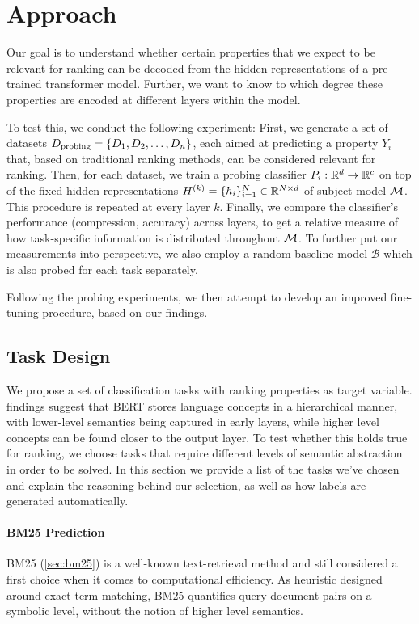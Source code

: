 \chapter{Approach}
\label{chap:approach}

Our goal is to understand whether certain properties that we expect to be relevant for ranking can be decoded from the hidden representations of a pre-trained transformer model. Further, we want to know to which degree these properties are encoded at different layers within the model.

To test this, we conduct the following experiment: First, we generate a set of datasets $D_{\text{probing}}=\{D_1, D_2, \dots, D_n \}$, each aimed at predicting a property $Y_i$ that, based on traditional ranking methods, can be considered relevant for ranking. Then, for each dataset, we train a probing classifier $P_i: \mathbb{R}^d \rightarrow \mathbb{R}^c$ on top of the fixed hidden representations $H^{(k)} = \{h_i\}_{i=1}^N \in \mathbb{R}^{N \times d}$ of subject model $\mathcal{M}$. This procedure is repeated at every layer $k$. Finally, we compare the classifier's performance (compression, accuracy) across layers, to get a relative measure of how task-specific information is distributed throughout $\mathcal{M}$. To further put our measurements into perspective, we also employ a random baseline model $\mathcal{B}$ which is also probed for each task separately.

Following the probing experiments, we then attempt to develop an improved fine-tuning procedure, based on our findings.

\section{Task Design}
\label{sec:tasks}
We propose a set of classification tasks with ranking properties as target variable. \cite{tenney-etal-2019-bert} findings suggest that BERT stores language concepts in a hierarchical manner, with lower-level semantics being captured in early layers, while higher level concepts can be found closer to the output layer. To test whether this holds true for ranking, we choose tasks that require different levels of semantic abstraction in order to be solved. In this section we provide a list of the tasks we've chosen and explain the reasoning behind our selection, as well as how labels are generated automatically.

\subsubsection{BM25 Prediction}
BM25 (\autoref{sec:bm25}) is a well-known text-retrieval method and still considered a first choice when it comes to computational efficiency. As heuristic designed around exact term matching, BM25 quantifies query-document pairs on a symbolic level, without the notion of higher level semantics.

